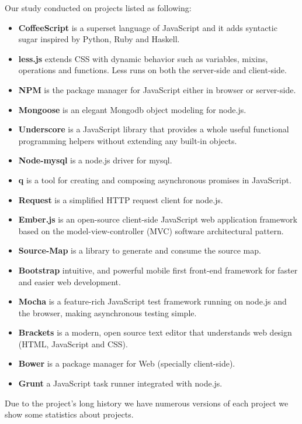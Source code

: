 Our study conducted on projects listed as following:
\begin{itemize}
	\item \textbf{CoffeeScript} is a superset language of JavaScript and it adds syntactic sugar inspired by Python, Ruby and Haskell.
	\item \textbf{less.js} extends CSS with dynamic behavior such as variables, mixins, operations and functions. Less runs on both the server-side and client-side.
	\item \textbf{NPM} is the package manager for JavaScript either in browser or server-side.
	\item \textbf {Mongoose} is an elegant Mongodb object modeling for node.js.
	\item \textbf{Underscore} is a JavaScript library that provides a whole useful functional programming helpers without extending any built-in objects.
	\item \textbf {Node-mysql} is a node.js driver for mysql.
	\item \textbf {q} is a tool for creating and composing asynchronous promises in JavaScript.
	\item \textbf {Request} is a simplified HTTP request client for node.js.
	\item \textbf{Ember.js} is an open-source client-side JavaScript web application framework based on the model-view-controller (MVC) software architectural pattern.
	\item \textbf{Source-Map} is a library to generate and consume the source map.
	\item \textbf{Bootstrap} intuitive, and powerful mobile first front-end framework for faster and easier web development.
	\item \textbf{Mocha} is a feature-rich JavaScript test framework running on node.js and the browser, making asynchronous testing simple.
	\item \textbf{Brackets} is a modern, open source text editor that understands web design (HTML, JavaScript and CSS).
	\item \textbf{Bower} is a package manager for Web (specially client-side).
	\item \textbf{Grunt} a JavaScript task runner integrated with node.js.	
\end{itemize} 
Due to the project's long history we have numerous versions of each project we show some statistics about projects.
